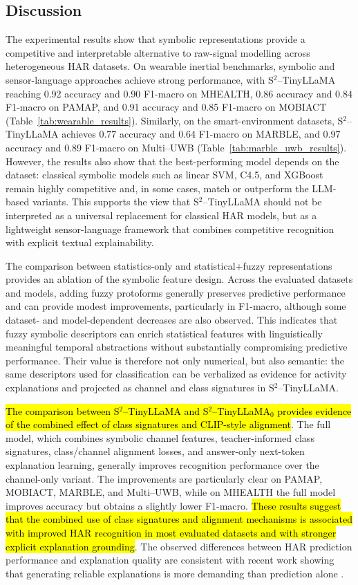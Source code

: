 \documentclass[preprint,12pt]{elsarticle}
\begin{document}
\subsection{Discussion}

The experimental results show that symbolic representations provide a competitive and interpretable alternative to raw-signal modelling across heterogeneous HAR datasets. On wearable inertial benchmarks, symbolic and sensor-language approaches achieve strong performance, with S$^2$--TinyLLaMA reaching 0.92 accuracy and 0.90 F1-macro on MHEALTH, 0.86 accuracy and 0.84 F1-macro on PAMAP, and 0.91 accuracy and 0.85 F1-macro on MOBIACT (Table~\ref{tab:wearable_results}). Similarly, on the smart-environment datasets, S$^2$--TinyLLaMA achieves 0.77 accuracy and 0.64 F1-macro on MARBLE, and 0.97 accuracy and 0.89 F1-macro on Multi--UWB (Table~\ref{tab:marble_uwb_results}). However, the results also show that the best-performing model depends on the dataset: classical symbolic models such as linear SVM, C4.5, and XGBoost remain highly competitive and, in some cases, match or outperform the LLM-based variants. This supports the view that S$^2$--TinyLLaMA should not be interpreted as a universal replacement for classical HAR models, but as a lightweight sensor-language framework that combines competitive recognition with explicit textual explainability.

The comparison between statistics-only and statistical+fuzzy representations provides an ablation of the symbolic feature design. Across the evaluated datasets and models, adding fuzzy protoforms generally preserves predictive performance and can provide modest improvements, particularly in F1-macro, although some dataset- and model-dependent decreases are also observed. This indicates that fuzzy symbolic descriptors can enrich statistical features with linguistically meaningful temporal abstractions without substantially compromising predictive performance. Their value is therefore not only numerical, but also semantic: the same descriptors used for classification can be verbalized as evidence for activity explanations and projected as channel and class signatures in S$^2$--TinyLLaMA.

\hl{The comparison between S$^2$--TinyLLaMA and S$^2$--TinyLLaMA$_0$ provides evidence of the combined effect of class signatures and CLIP-style alignment}. The full model, which combines symbolic channel features, teacher-informed class signatures, class/channel alignment losses, and answer-only next-token explanation learning, generally improves recognition performance over the channel-only variant. The improvements are particularly clear on PAMAP, MOBIACT, MARBLE, and Multi--UWB, while on MHEALTH the full model improves accuracy but obtains a slightly lower F1-macro. \hl{These results suggest that the combined use of class signatures and alignment mechanisms is associated with improved HAR recognition in most evaluated datasets and with stronger explicit explanation grounding}. The observed differences between HAR prediction performance and explanation quality are consistent with recent work showing that generating reliable explanations is more demanding than prediction alone \cite{quiles2026explaining}.
\end{document}
